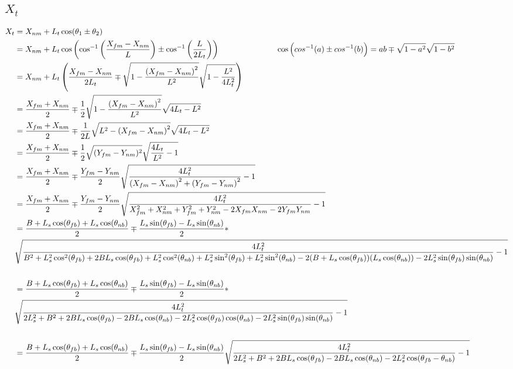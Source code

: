 \documentclass[11pt, landscape]{article}
\begin{document}
\subsection{$X_t$}
\begin{align*}
  X_t &= X_{nm} + L_t\cos(\theta_1 \pm \theta_2)\\
  &= X_{nm} + L_t\cos\left(\cos^{-1}\left(\frac{X_{fm}-X_{nm}}{L}\right) \pm \cos^{-1}\left(\frac{L}{2L_t}\right) \right)
  \hspace*{1in} \cos\Big(cos^{-1}(a)\pm cos^{-1}(b)\Big) = ab \mp \sqrt{1-a^2}\sqrt{1-b^2}\\
  &= X_{nm} + L_t\left(\frac{X_{fm}-X_{nm}}{2L_t} \mp \sqrt{1 - \frac{\left(X_{fm}-X_{nm}\right)^2}{L^2}}\sqrt{1 - \frac{L^2}{4L_t^2}}\right)\\
  &= \frac{X_{fm}+X_{nm}}{2} \mp \frac{1}{2}\sqrt{1 - \frac{\left(X_{fm}-X_{nm}\right)^2}{L^2}}\sqrt{4L_t - L^2}\\
  &= \frac{X_{fm}+X_{nm}}{2} \mp \frac{1}{2L}\sqrt{L^2 - \left(X_{fm}-X_{nm}\right)^2}\sqrt{4L_t - L^2}\\
  &= \frac{X_{fm}+X_{nm}}{2} \mp \frac{1}{2}\sqrt{(Y_{fm}-Y_{nm})^2}\sqrt{\frac{4L_t}{L^2} - 1}\\
  &= \frac{X_{fm}+X_{nm}}{2} \mp \frac{Y_{fm}-Y_{nm}}{2}\sqrt{\frac{4L_t^2}{\left(X_{fm}-X_{nm}\right)^2 + \left(Y_{fm}-Y_{nm}\right)^2} -1}\\
  &= \frac{X_{fm}+X_{nm}}{2} \mp \frac{Y_{fm}-Y_{nm}}{2}\sqrt{\frac{4L_t^2}{X_{fm}^2 + X_{nm}^2 + Y_{fm}^2 + Y_{nm}^2 -2X_{fm}X_{nm} -2Y_{fm}Y_{nm}} -1}\\
  &= \frac{B + L_s\cos(\theta_{fb}) + L_s\cos(\theta_{nb})}{2} \mp \frac{L_s\sin(\theta_{fb})-L_s\sin(\theta_{nb})}{2} * \\
  &\sqrt{\frac{4L_t^2}{B^2 + L_s^2\cos^2(\theta_{fb}) + 2BL_s\cos(\theta_{fb}) + L_s^2\cos^2(\theta_{nb}) + L_s^2\sin^2(\theta_{fb}) + L_s^2\sin^2(\theta_{nb}) -2(B + L_s\cos(\theta_{fb}))(L_s\cos(\theta_{nb})) -2L_s^2\sin(\theta_{fb})\sin(\theta_{nb})} -1}\\\\
  &= \frac{B + L_s\cos(\theta_{fb}) + L_s\cos(\theta_{nb})}{2} \mp \frac{L_s\sin(\theta_{fb})-L_s\sin(\theta_{nb})}{2} * \\
  &\sqrt{\frac{4L_t^2}{2L_s^2 + B^2 + 2BL_s\cos(\theta_{fb}) - 2BL_s\cos(\theta_{nb}) - 2L_s^2\cos(\theta_{fb})\cos(\theta_{nb}) - 2L_s^2\sin(\theta_{fb})\sin(\theta_{nb})} -1}\\\\
  &= \frac{B + L_s\cos(\theta_{fb}) + L_s\cos(\theta_{nb})}{2} \mp \frac{L_s\sin(\theta_{fb})-L_s\sin(\theta_{nb})}{2}\sqrt{\frac{4L_t^2}{2L_s^2 + B^2 + 2BL_s\cos(\theta_{fb}) - 2BL_s\cos(\theta_{nb}) - 2L_s^2\cos(\theta_{fb} - \theta_{nb})} -1}\\

\end{align*}
\end{document}
